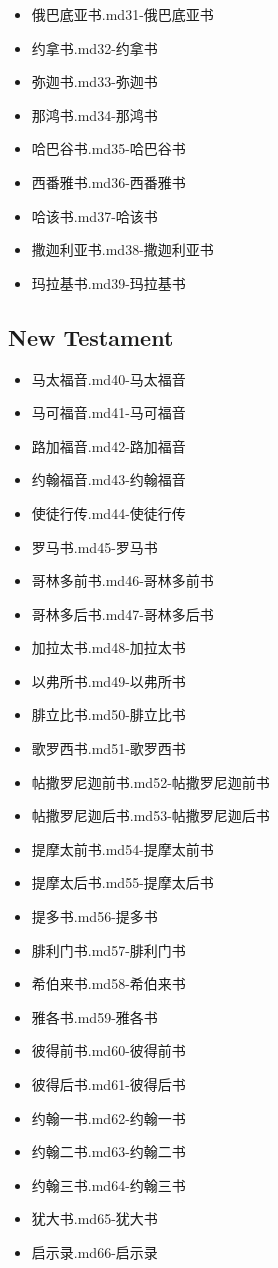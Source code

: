 \documentclass{article}
\begin{document}
\begin{itemize}
  {阿摩司书.md}{30-阿摩司书}
\item
  {俄巴底亚书.md}{31-俄巴底亚书}
\item
  {约拿书.md}{32-约拿书}
\item
  {弥迦书.md}{33-弥迦书}
\item
  {那鸿书.md}{34-那鸿书}
\item
  {哈巴谷书.md}{35-哈巴谷书}
\item
  {西番雅书.md}{36-西番雅书}
\item
  {哈该书.md}{37-哈该书}
\item
  {撒迦利亚书.md}{38-撒迦利亚书}
\item
  {玛拉基书.md}{39-玛拉基书}
\end{itemize}


\subsection{New Testament}\label{header-n81}

\begin{itemize}
\item
  {马太福音.md}{40-马太福音}
\item
  {马可福音.md}{41-马可福音}
\item
  {路加福音.md}{42-路加福音}
\item
  {约翰福音.md}{43-约翰福音}
\item
  {使徒行传.md}{44-使徒行传}
\item
  {罗马书.md}{45-罗马书}
\item
  {哥林多前书.md}{46-哥林多前书}
\item
  {哥林多后书.md}{47-哥林多后书}
\item
  {加拉太书.md}{48-加拉太书}
\item
  {以弗所书.md}{49-以弗所书}
\item
  {腓立比书.md}{50-腓立比书}
\item
  {歌罗西书.md}{51-歌罗西书}
\item
  {帖撒罗尼迦前书.md}{52-帖撒罗尼迦前书}
\item
  {帖撒罗尼迦后书.md}{53-帖撒罗尼迦后书}
\item
  {提摩太前书.md}{54-提摩太前书}
\item
  {提摩太后书.md}{55-提摩太后书}
\item
  {提多书.md}{56-提多书}
\item
  {腓利门书.md}{57-腓利门书}
\item
  {希伯来书.md}{58-希伯来书}
\item
  {雅各书.md}{59-雅各书}
\item
  {彼得前书.md}{60-彼得前书}
\item
  {彼得后书.md}{61-彼得后书}
\item
  {约翰一书.md}{62-约翰一书}
\item
  {约翰二书.md}{63-约翰二书}
\item
  {约翰三书.md}{64-约翰三书}
\item
  {犹大书.md}{65-犹大书}
\item
  {启示录.md}{66-启示录}
\end{itemize}
\end{document}
